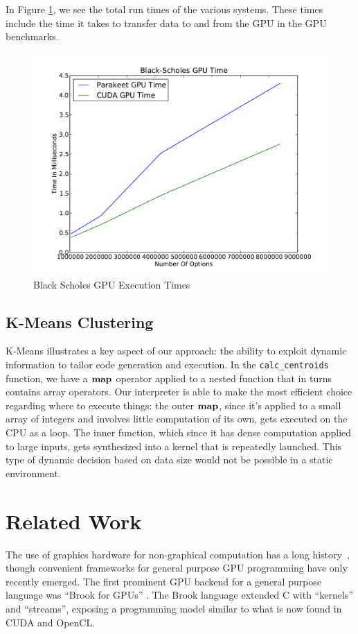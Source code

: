 \documentclass[preprint]{sigplanconf}
\begin{document}
In Figure \ref{BSResults}, we see the total run times of the various systems.
These times include the time it takes to transfer data to and from the GPU in
the GPU benchmarks.  

\begin{figure}
\includegraphics[scale=0.45]{BSGPU.pdf}
\caption{Black Scholes GPU Execution Times}
\label{BSResults}
\end{figure}

\subsection{K-Means Clustering}


K-Means illustrates a key aspect of our approach: the ability to exploit
dynamic information to tailor code generation and execution.  In the
\texttt{calc\_centroids} function, we have a $\mbox{\textbf{map}}$ operator applied to a
nested function that in turns contains array operators.  Our interpreter is
able to make the most efficient choice regarding where to execute things: the
outer $\mbox{\textbf{map}}$, since it's applied to a small array of integers and involves
little computation of its own, gets executed on the CPU as a loop.  The inner
function, which since it has dense computation applied to large inputs, gets
synthesized into a kernel that is repeatedly launched.  This type of dynamic
decision based on data size would not be possible in a static environment.

\section{Related Work}
\label{RelatedWork}
The use of graphics hardware for non-graphical computation has a  long
history~\cite{Lengyel90}, though convenient frameworks for general purpose GPU
programming have only recently emerged. The first prominent GPU backend for a
general purpose language was ``Brook for GPUs'' \cite{Buck04}. The Brook
language extended C with ``kernels'' and
``streams'', exposing a programming model similar to what is now found in CUDA
and OpenCL.
\end{document}

